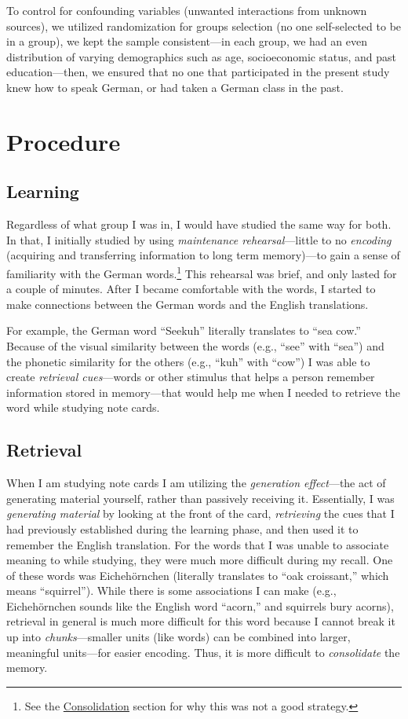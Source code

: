 \documentclass[stu,12pt,floatsintext]{apa7}
\begin{document}
To control for confounding variables (unwanted interactions from unknown sources), we utilized randomization for groups selection (no one self-selected to be in a group), we kept the sample consistent---in each group, we had an even distribution of varying demographics such as age, socioeconomic status, and past education---then, we ensured that no one that participated in the present study knew how to speak German, or had taken a German class in the past.

\section{Procedure}

\subsection{Learning}

Regardless of what group I was in, I would have studied the same way for both. In that, I initially studied by using \textit{maintenance rehearsal}---little to no \textit{encoding} (acquiring and transferring information to long term memory)---to gain a sense of familiarity with the German words.\footnote{See the \hyperlink{consolidation}{Consolidation} section for why this was not a good strategy.} This rehearsal was brief, and only lasted for a couple of minutes. After I became comfortable with the words, I started to make connections between the German words and the English translations. 

For example, the German word ``Seekuh'' literally translates to ``sea cow.'' Because of the visual similarity between the words (e.g., ``see'' with ``sea'') and the phonetic similarity for the others (e.g., ``kuh'' with ``cow'') I was able to create \textit{retrieval cues}---words or other stimulus that helps a person remember information stored in memory---that would help me when I needed to retrieve the word while studying note cards.

\subsection{Retrieval}

When I am studying note cards I am utilizing the \textit{generation effect}---the act of generating material yourself, rather than passively receiving it. Essentially, I was \textit{generating material} by looking at the front of the card, \textit{retrieving} the cues that I had previously established during the learning phase, and then used it to remember the English translation. For the words that I was unable to associate meaning to while studying, they were much more difficult during my recall. One of these words was Eicheh\"ornchen (literally translates to ``oak croissant,'' which means ``squirrel''). While there is some associations I can make (e.g., Eicheh\"ornchen sounds like the English word ``acorn,'' and squirrels bury acorns), retrieval in general is much more difficult for this word because I cannot break it up into \textit{chunks}---smaller units (like words) can be combined into larger, meaningful units---for easier encoding. Thus, it is more difficult to \textit{consolidate} the memory.
\end{document}
